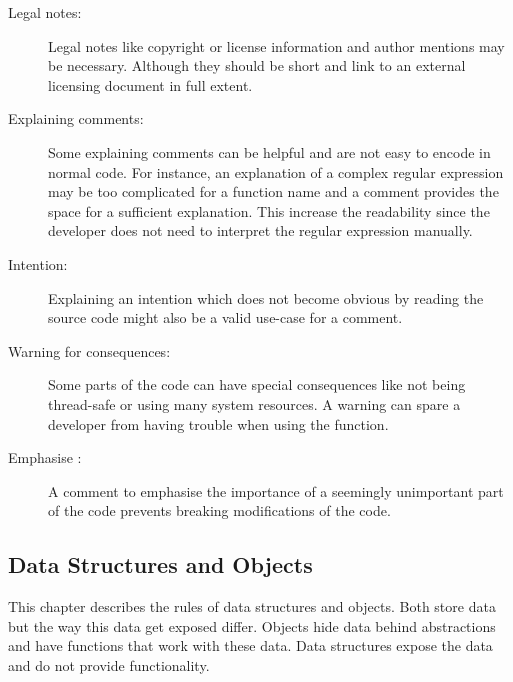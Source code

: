 \begin{description}
    \item[Legal notes:] Legal notes like copyright or license information and author mentions may be necessary. Although they should be short and link to an external licensing document in full extent.
    \item[Explaining comments:] Some explaining comments can be helpful and are not easy to encode in normal code. For instance, an explanation of a complex regular expression may be too complicated for a function name and a comment provides the space for a sufficient explanation. This increase the readability since the developer does not need to interpret the regular expression manually.
    \item[Intention:] Explaining an intention which does not become obvious by reading the source code might also be a valid use-case for a comment. 
    \item[Warning for consequences:] Some parts of the code can have special consequences like not being thread-safe or using many system resources. A warning can spare a developer from having trouble when using the function.
    \item[Emphasise :] A comment to emphasise the importance of a seemingly unimportant part of the code prevents breaking modifications of the code. 
\end{description}

\subsection{Data Structures and Objects}
This chapter describes the rules of data structures and objects. Both store data but the way this data get exposed differ. Objects hide data behind abstractions and have functions that work with these data. Data structures expose the data and do not provide functionality. 

